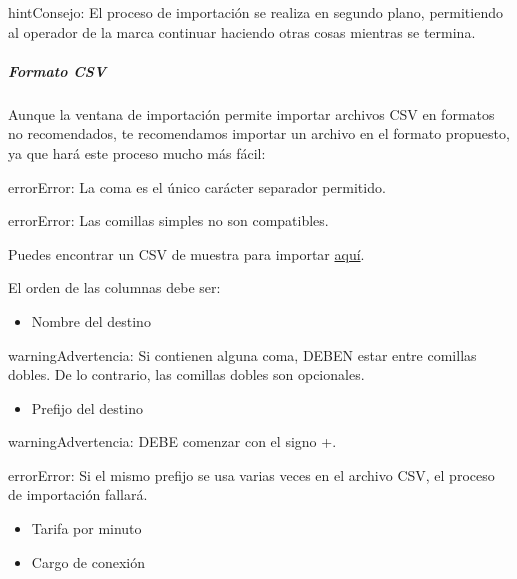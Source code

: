 \documentclass[letterpaper,10pt,spanish]{sphinxmanual}
\begin{document}
\begin{notice}{hint}{Consejo:}
El proceso de importación se realiza en segundo plano, permitiendo al operador de la marca continuar haciendo otras cosas mientras se termina.
\end{notice}


\subparagraph{Formato CSV}
\label{administration_portal/brand/billing/destination_rates:csv-format}
Aunque la ventana de importación permite importar archivos CSV en formatos no recomendados, te recomendamos importar un archivo en el formato propuesto, ya que hará este proceso mucho más fácil:

\begin{notice}{error}{Error:}
La coma es el único carácter separador permitido.
\end{notice}

\begin{notice}{error}{Error:}
Las comillas simples no son compatibles.
\end{notice}

Puedes encontrar un CSV de muestra para importar \href{https://raw.githubusercontent.com/irontec/ivozprovider/main/web/portal/brand/samples/billing/pricesSample.csv}{aquí}.

El orden de las columnas debe ser:
\begin{itemize}
\item {} 
Nombre del destino

\end{itemize}

\begin{notice}{warning}{Advertencia:}
Si contienen alguna coma, DEBEN estar entre comillas dobles. De lo contrario, las comillas dobles son opcionales.
\end{notice}
\begin{itemize}
\item {} 
Prefijo del destino

\end{itemize}

\begin{notice}{warning}{Advertencia:}
DEBE comenzar con el signo +.
\end{notice}

\begin{notice}{error}{Error:}
Si el mismo prefijo se usa varias veces en el archivo CSV, el proceso de importación fallará.
\end{notice}
\begin{itemize}
\item {} 
Tarifa por minuto

\item {} 
Cargo de conexión

\end{itemize}
\end{document}
